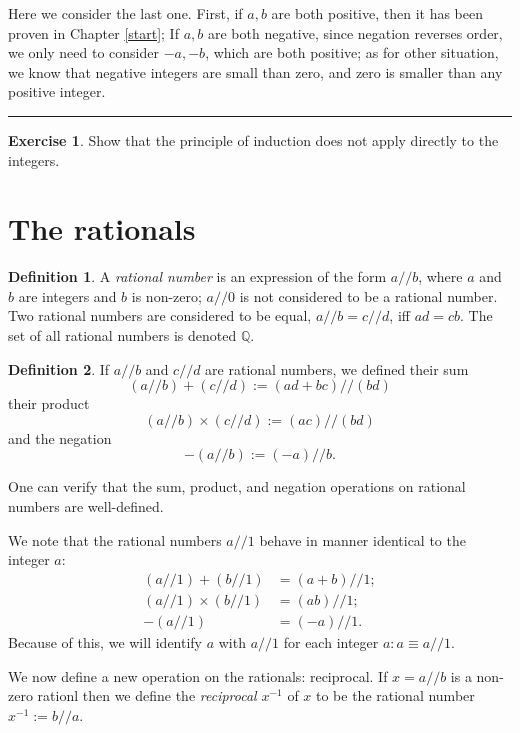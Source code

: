\documentclass[
]{book}
\theoremstyle{definition}
\newtheorem{definition}{Definition}[chapter]
\theoremstyle{definition}
\theoremstyle{definition}
\newtheorem{exercise}{Exercise}[chapter]
\theoremstyle{definition}
\theoremstyle{remark}
\begin{document}
Here we consider the last one. First, if \(a,b\) are both positive, then it has been proven in Chapter \ref{start}; If \(a,b\) are both negative, since negation reverses order, we only need to consider \(-a,-b\), which are both positive; as for other situation, we know that negative integers are small than zero, and zero is smaller than any positive integer.

\begin{center}\rule{0.5\linewidth}{0.5pt}\end{center}

\begin{exercise}
Show that the principle of induction does not apply directly to the integers.
\end{exercise}

\section{The rationals}\label{the-rationals}

\begin{definition}
A \emph{rational number} is an expression of the form \(a//b\), where \(a\) and \(b\) are integers and \(b\) is non-zero; \(a//0\) is not considered to be a rational number. Two rational numbers are considered to be equal, \(a//b=c//d\), iff \(ad=cb\). The set of all rational numbers is denoted \(\mathbb{Q}\).
\end{definition}

\begin{definition}
If \(a//b\) and \(c//d\) are rational numbers, we defined their sum
\[
(a//b) + (c//d) := (ad+bc)//(bd)
\]
their product
\[
(a//b)\times(c//d) := (ac)//(bd)
\]
and the negation
\[
-(a//b):=(-a)//b.
\]
\end{definition}

One can verify that the sum, product, and negation operations on rational numbers are well-defined.

We note that the rational numbers \(a//1\) behave in manner identical to the integer \(a\):
\[
\begin{aligned}
(a//1)+(b//1)&=(a+b)//1;\\
(a//1)\times(b//1)&=(ab)//1;\\
-(a//1)&=(-a)//1.
\end{aligned}
\]
Because of this, we will identify \(a\) with \(a//1\) for each integer \(a:a\equiv a//1\).

We now define a new operation on the rationals: reciprocal. If \(x=a//b\) is a non-zero rationl then we define the \emph{reciprocal} \(x^{-1}\) of \(x\) to be the rational number \(x^{-1}:=b//a\).
\end{document}
